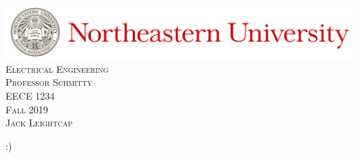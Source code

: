\documentclass{article}
\newcommand\course{EECE 1234}
\newcommand\coursetitle{Electrical Engineering}
\newcommand\prof{Schmitty}
\newcommand\semester{Fall 2019}
\newcommand\name{Jack Leightcap}
\begin{document}
\begin{titlepage}
	\centering
	\includegraphics[width=\textwidth]{./Images/Header.jpeg}\\
	\vspace*{\fill}
	\textsc{\LARGE{\coursetitle}}\\[0.3cm]
	\textsc{\Large{Professor \prof}}\\[0.3cm]
	\textsc{\large{\course}}\\[0.3cm]
	\textsc{\large{\semester}}\\
	\vspace*{\fill}
	\textsc{\name}
\end{titlepage}
\tableofcontents
\pagebreak
\clearpage
\setcounter{page}{1}
\pagestyle{fancy}

:)
\end{document}
